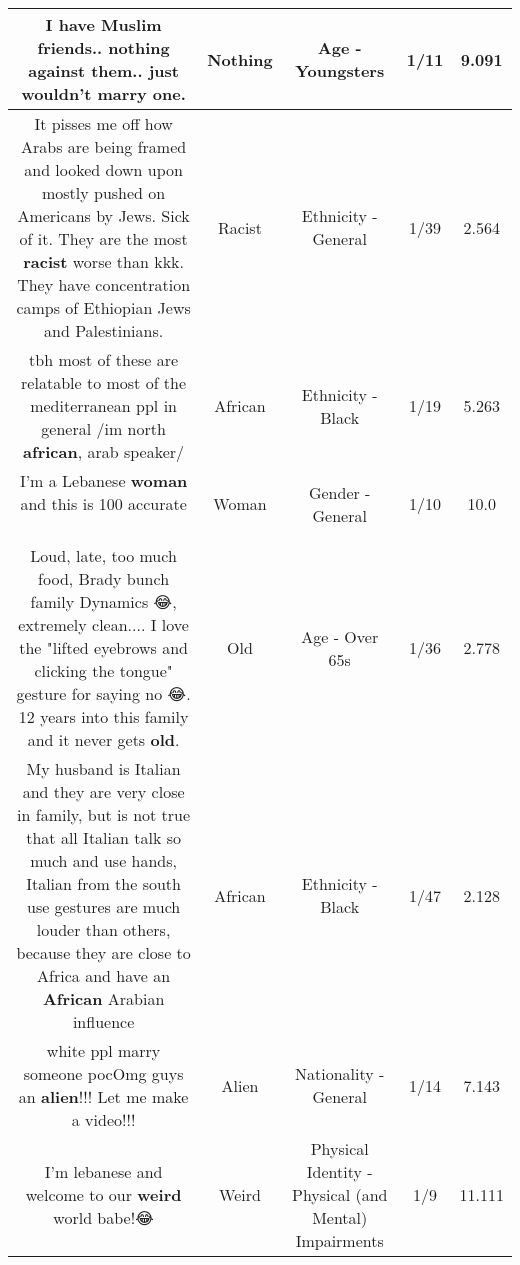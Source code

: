 \documentclass[11pt]{article}
\newlength\mylength
\begin{document}
\begin{center}
\begin{longtable}{|C{.65\mylength}|C{.30\mylength}|C{.12\mylength}|C{.12\mylength}|C{.12\mylength}|}
  \small I have Muslim friends.. \textbf{nothing} against them.. just wouldn't marry one.\normalsize   & Nothing & Age - Youngsters & 1/11 & 9.091 \\  \hline
  \small It pisses me off how Arabs are being framed and looked down upon mostly pushed on Americans by Jews. Sick of it. They are the most \textbf{racist} worse than kkk. They have concentration camps of Ethiopian Jews and Palestinians.\normalsize   & Racist & Ethnicity - General & 1/39 & 2.564 \\  \hline
  \small tbh most of these are relatable to most of the mediterranean ppl in general /im north \textbf{african}, arab speaker/\normalsize   & African & Ethnicity - Black & 1/19 & 5.263 \\  \hline
  \small I'm a Lebanese \textbf{woman} and this is 100 accurate 🤣😂😂\normalsize   & Woman & Gender - General & 1/10 & 10.0 \\  \hline
  \small Loud, late, too much food, Brady bunch family Dynamics 😂, extremely clean.... I love the "lifted eyebrows and clicking the tongue" gesture for saying no 😂. 12 years into this family and it never gets \textbf{old}.\normalsize   & Old & Age - Over 65s & 1/36 & 2.778 \\  \hline
  \small My husband is Italian and they are very close in family,  but  is not true that all Italian talk so much  and use hands, Italian from the south use gestures are much  louder than others,   because they are close  to Africa  and have an \textbf{African} Arabian  influence\normalsize   & African & Ethnicity - Black & 1/47 & 2.128 \\  \hline
  \small white ppl marry someone pocOmg guys an \textbf{alien}!!! Let me make a video!!!\normalsize   & Alien & Nationality - General & 1/14 & 7.143 \\  \hline
  \small I'm lebanese and welcome to our \textbf{weird} world babe!😂\normalsize   & Weird & Physical Identity - Physical (and Mental) Impairments & 1/9 & 11.111 \\  \hline

\end{longtable}
\end{center}
\end{document}
